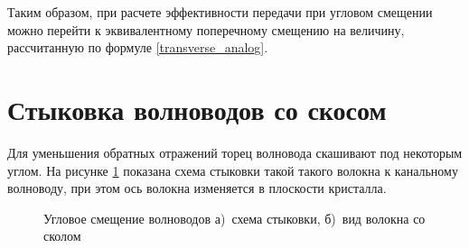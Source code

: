 Таким образом, при расчете эффективности передачи при  угловом смещении можно перейти к эквивалентному поперечному смещению на величину, рассчитанную по формуле \ref{transverse_analog}.

\section{Стыковка волноводов со скосом}
Для уменьшения обратных отражений торец волновода скашивают под некоторым углом. На рисунке \ref{angular_movement} показана схема стыковки такой такого волокна к канальному волноводу, при этом ось волокна изменяется в плоскости кристалла. 

\begin{figure}[h!]
	\begin{minipage}[h]{0.49\linewidth}
	\end{minipage}
	\hfill
	\begin{minipage}[h]{0.49\linewidth}
	\end{minipage}
	\caption{Угловое смещение волноводов а)~схема стыковки, б)~вид волокна со сколом}
	\label{angular_movement}
\end{figure}

